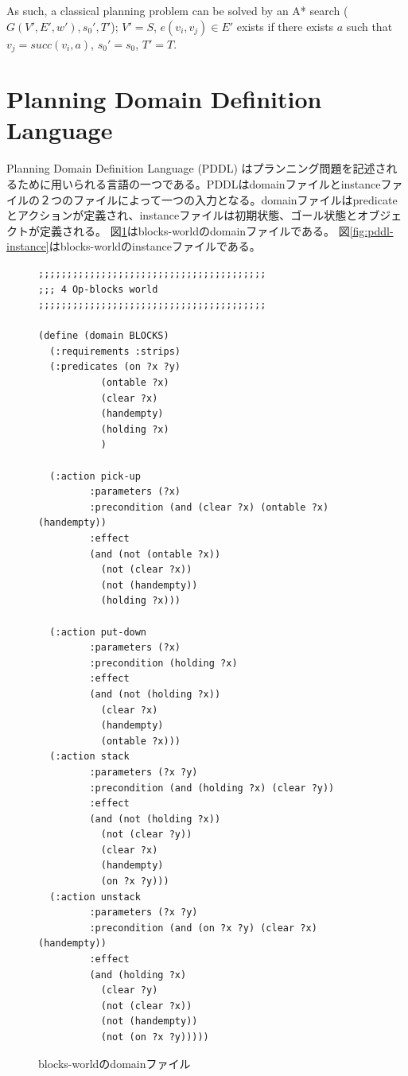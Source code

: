 \documentclass{report}
\begin{document}
As such, a classical planning problem can be solved by an A* search ($G(V', E', w'), s_0', T'$); $V' = S$, $e(v_i, v_j) \in E'$ exists if there exists $a$ such that $v_j = succ(v_i, a)$, $s_0' = s_0$, $T' = T$.

\section{Planning Domain Definition Language}
Planning Domain Definition Language (PDDL) \cite{aeronautiques1998pddl}はプランニング問題を記述されるために用いられる言語の一つである。PDDLはdomainファイルとinstanceファイルの２つのファイルによって一つの入力となる。domainファイルはpredicateとアクションが定義され、instanceファイルは初期状態、ゴール状態とオブジェクトが定義される。
図\ref{fig:pddl-domain}はblocks-worldのdomainファイルである。
図\ref{fig:pddl-instance}はblocks-worldのinstanceファイルである。


\begin{figure}
\begin{adjustbox}{width=\textwidth,keepaspectratio}
\lstset{language=pddl}
\begin{lstlisting}
;;;;;;;;;;;;;;;;;;;;;;;;;;;;;;;;;;;;;;;;
;;; 4 Op-blocks world
;;;;;;;;;;;;;;;;;;;;;;;;;;;;;;;;;;;;;;;;

(define (domain BLOCKS)
  (:requirements :strips)
  (:predicates (on ?x ?y)
	       (ontable ?x)
	       (clear ?x)
	       (handempty)
	       (holding ?x)
	       )

  (:action pick-up
	     :parameters (?x)
	     :precondition (and (clear ?x) (ontable ?x) (handempty))
	     :effect
	     (and (not (ontable ?x))
		   (not (clear ?x))
		   (not (handempty))
		   (holding ?x)))

  (:action put-down
	     :parameters (?x)
	     :precondition (holding ?x)
	     :effect
	     (and (not (holding ?x))
		   (clear ?x)
		   (handempty)
		   (ontable ?x)))
  (:action stack
	     :parameters (?x ?y)
	     :precondition (and (holding ?x) (clear ?y))
	     :effect
	     (and (not (holding ?x))
		   (not (clear ?y))
		   (clear ?x)
		   (handempty)
		   (on ?x ?y)))
  (:action unstack
	     :parameters (?x ?y)
	     :precondition (and (on ?x ?y) (clear ?x) (handempty))
	     :effect
	     (and (holding ?x)
		   (clear ?y)
		   (not (clear ?x))
		   (not (handempty))
		   (not (on ?x ?y)))))
\end{lstlisting}
\end{adjustbox}
\caption{blocks-worldのdomainファイル}
\label{fig:pddl-domain}
\end{figure}
\end{document}
